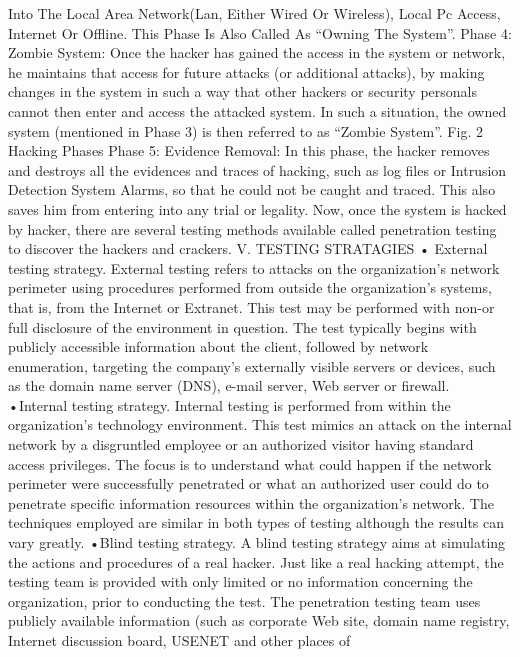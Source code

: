 Into The Local Area Network(Lan, Either Wired Or 
Wireless), Local Pc Access, Internet Or Offline. This Phase 
Is Also Called As “Owning The System”. 
Phase 4: Zombie System: Once the hacker has gained the 
access in the system or network, he maintains that access 
for future attacks (or additional attacks), by making 
changes in the system in such a way that other hackers or 
security personals cannot then enter and access the attacked 
system. In such a situation, the owned system (mentioned 
in Phase 3) is then referred to as “Zombie System”.  
Fig. 2  Hacking Phases 
Phase 5: Evidence Removal: In this phase, the hacker 
removes and destroys all the evidences and traces of 
hacking, such as log files or Intrusion Detection System 
Alarms, so that he could not be caught and traced. This also 
saves him from entering into any trial or legality. Now, 
once the system is hacked by hacker, there are several 
testing methods available called penetration testing to 
discover the hackers and crackers. 
V. TESTING STRATAGIES 
• External testing strategy. External testing refers to attacks 
on the organization's network perimeter using procedures 
performed from outside the organization's systems, that is, 
from the Internet or Extranet. This test may be performed 
with non-or full disclosure of the environment in question. 
The test typically begins with publicly accessible 
information about the client, followed by network 
enumeration, targeting the company's externally visible 
servers or devices, such as the domain name server (DNS), 
e-mail server, Web server or firewall. 
•Internal testing strategy. Internal testing is performed from 
within the organization's technology environment. This test 
mimics an attack on the internal network by a disgruntled 
employee or an authorized visitor having standard access 
privileges. The focus is to understand what could happen if 
the network perimeter were successfully penetrated or what 
an authorized user could do to penetrate specific 
information resources within the organization's network. 
The techniques employed are similar in both types of 
testing although the results can vary greatly. 
•Blind testing strategy. A blind testing strategy aims at 
simulating the actions and procedures of a real hacker. Just 
like a real hacking attempt, the testing team is provided  with only limited or no information concerning the 
organization, prior to conducting the test. The penetration 
testing team uses publicly available information (such as 
corporate Web site, domain name registry, Internet 
discussion board, USENET and other places of 
